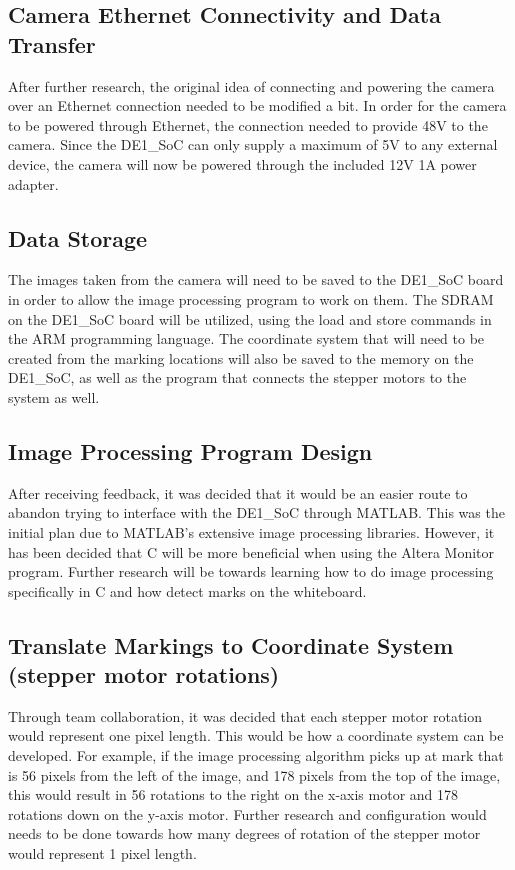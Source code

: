 \subsection{Camera Ethernet Connectivity and Data Transfer}
After further research, the original idea of connecting and powering the camera over an Ethernet connection needed to be modified a bit. In order for the camera to be powered through Ethernet, the connection needed to provide 48V to the camera. Since the DE1\_SoC can only supply a maximum of 5V to any external device, the camera will now be powered through the included 12V 1A power adapter. 
\subsection{Data Storage}
The images taken from the camera will need to be saved to the DE1\_SoC board in order to allow the image processing program to work on them. The SDRAM on the DE1\_SoC board will be utilized, using the load and store commands in the ARM programming language. The coordinate system that will need to be created from the marking locations will also be saved to the memory on the DE1\_SoC, as well as the program that connects the stepper motors to the system as well.
\subsection{Image Processing Program Design}
After receiving feedback, it was decided that it would be an easier route to abandon trying to interface with the DE1\_SoC through MATLAB. This was the initial plan due to MATLAB's extensive image processing libraries. However, it has been decided that C will be more beneficial when using the Altera Monitor program. Further research will be towards learning how to do image processing specifically in C and how detect marks on the whiteboard.
\subsection{Translate Markings to Coordinate System (stepper motor rotations)}
Through team collaboration, it was decided that each stepper motor rotation would represent one pixel length. This would be how a coordinate system can be developed. For example, if the image processing algorithm picks up at mark that is 56 pixels from the left of the image, and 178 pixels from the top of the image, this would result in 56 rotations to the right on the x-axis motor and 178 rotations down on the y-axis motor. Further research and configuration would needs to be done towards how many degrees of rotation of the stepper motor would represent 1 pixel length.
